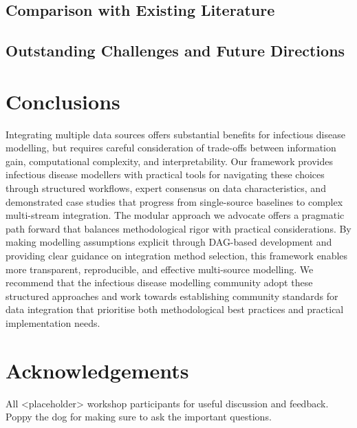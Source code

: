 \documentclass{article}
\begin{document}
\subsection{Comparison with Existing Literature}

\subsection{Outstanding Challenges and Future Directions}



\section{Conclusions}

Integrating multiple data sources offers substantial benefits for infectious disease modelling, but requires careful consideration of trade-offs between information gain, computational complexity, and interpretability.
Our framework provides infectious disease modellers with practical tools for navigating these choices through structured workflows, expert consensus on data characteristics, and demonstrated case studies that progress from single-source baselines to complex multi-stream integration.
The modular approach we advocate offers a pragmatic path forward that balances methodological rigor with practical considerations.
By making modelling assumptions explicit through DAG-based development and providing clear guidance on integration method selection, this framework enables more transparent, reproducible, and effective multi-source modelling.
We recommend that the infectious disease modelling community adopt these structured approaches and work towards establishing community standards for data integration that prioritise both methodological best practices and practical implementation needs.

\section{Acknowledgements}

All <placeholder> workshop participants for useful discussion and feedback. Poppy the dog for making sure to ask the important questions.



\end{document}
